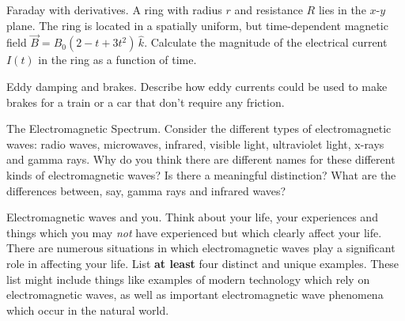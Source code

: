 \begin{aproblem}{Faraday with derivatives.} 
  A ring with radius $r$ and resistance $R$ lies in the $x$-$y$ plane.
  The ring is located in a spatially uniform, but time-dependent
  magnetic field $\vec{B} = B_0(2-t+3t^2)\, \widehat{k}$.  Calculate
  the magnitude of the electrical current $I(t)$ in the ring as a
  function of time.
  \label{prob:faraday}
\end{aproblem}

\begin{aproblem}{Eddy damping and brakes.} 
  Describe how eddy currents could be used to make brakes for a train
  or a car that don't require any friction.
\end{aproblem}

\begin{aproblem}{The Electromagnetic Spectrum.}  
  Consider the different types of electromagnetic waves: radio waves,
  microwaves, infrared, visible light, ultraviolet light, x-rays and
  gamma rays.  Why do you think there are different names for these
  different kinds of electromagnetic waves?  Is there a meaningful
  distinction?  What are the differences between, say, gamma rays and
  infrared waves?
\end{aproblem}


\begin{aproblem}{Electromagnetic waves and you}.  
  Think about your life, your experiences and things which you may
  {\it not} have experienced but which clearly affect your life. There
  are numerous situations in which electromagnetic waves play a
  significant role in affecting your life.  List {\bf at least} four
  distinct and unique examples.  These list might include things like
  examples of modern technology which rely on electromagnetic waves,
  as well as important electromagnetic wave phenomena which occur in
  the natural world.
\end{aproblem}


